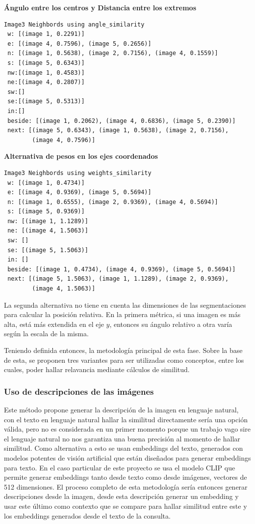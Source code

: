 \noindent\textbf{\'Angulo entre los centros y Distancia entre los extremos}
\begin{verbatim}
Image3 Neighbords using angle_similarity
 w: [(image 1, 0.2291)]
 e: [(image 4, 0.7596), (image 5, 0.2656)]
 n: [(image 1, 0.5638), (image 2, 0.7156), (image 4, 0.1559)]
 s: [(image 5, 0.6343)]
 nw:[(image 1, 0.4583)]
 ne:[(image 4, 0.2807)]
 sw:[]
 se:[(image 5, 0.5313)]
 in:[]
 beside: [(image 1, 0.2062), (image 4, 0.6836), (image 5, 0.2390)]
 next: [(image 5, 0.6343), (image 1, 0.5638), (image 2, 0.7156), 
        (image 4, 0.7596)]
\end{verbatim}

\noindent\textbf{Alternativa de pesos en los ejes coordenados}
\begin{verbatim}
Image3 Neighbords using weights_similarity
 w: [(image 1, 0.4734)]
 e: [(image 4, 0.9369), (image 5, 0.5694)]
 n: [(image 1, 0.6555), (image 2, 0.9369), (image 4, 0.5694)]
 s: [(image 5, 0.9369)]
 nw: [(image 1, 1.1289)]
 ne: [(image 4, 1.5063)]
 sw: []
 se: [(image 5, 1.5063)]
 in: []
 beside: [(image 1, 0.4734), (image 4, 0.9369), (image 5, 0.5694)]
 next: [(image 5, 1.5063), (image 1, 1.1289), (image 2, 0.9369),
        (image 4, 1.5063)]
\end{verbatim}
La segunda alternativa no tiene en cuenta las dimensiones de las segmentaciones para calcular la posición relativa. En la primera métrica, si una imagen es más alta, est\'a más extendida en el eje $y$, entonces su ángulo relativo a otra varía según la escala de la misma.

Teniendo definida entonces, la metodolog\'ia principal de esta fase. Sobre la base de esta, se proponen tres variantes para ser utilizadas como conceptos, entre los cuales, poder hallar relavancia mediante cálculos de similitud.

\subsubsection*{Uso de descripciones de las imágenes}
Este método propone generar la descripción de la imagen en lenguaje natural, con el texto en lenguaje natural hallar la similitud directamente sería una opción válida, pero no es considerada en un primer momento porque un trabajo vago sire el lenguaje natural no nos garantiza una buena precisión al momento de hallar similitud. Como alternativa a esto se usan embeddings del texto, generados con modelos potentes de visión artificial que están diseñados para generar embeddings para texto. En el caso particular de este proyecto se usa el modelo CLIP que permite generar embeddings tanto desde texto como desde imágenes, vectores de 512 dimensiones. El proceso completo de esta metodología sería entonces generar descripciones desde la imagen, desde esta descripción generar un embedding y usar este último como contexto que se compare para hallar similitud entre este y los embeddings generados desde el texto de la consulta.

